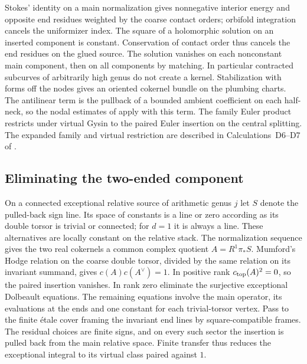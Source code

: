 Stokes' identity on a main normalization gives nonnegative interior
energy and opposite end residues weighted by the coarse contact
orders; orbifold integration cancels the uniformizer index. The
square of a holomorphic solution on an inserted component is
constant. Conservation of contact order thus cancels the end
residues on the glued source. The solution vanishes on each
nonconstant main component, then on all components by matching.
In particular contracted subcurves of arbitrarily high genus do not
create a kernel. Stabilization with forms off the nodes gives an
oriented cokernel bundle on the plumbing charts. The antilinear term
is the pullback of a bounded ambient coefficient on each half-neck,
so the nodal estimates of \cite[Appendix~B]{bai} apply with this term.
The family Euler product restricts under virtual Gysin to the paired
Euler insertion on the central splitting. The expanded family and
virtual restriction are described in
Calculations~D6--D7 of \cite{WueSupplement}.

\subsection{Eliminating the two-ended component}
On a connected exceptional relative source of arithmetic genus \(j\)
let \(S\) denote the pulled-back sign line. Its space of constants
is a line or zero according as its double torsor is trivial or
connected; for \(d=1\) it is always a line. These alternatives are
locally constant on the relative stack. The normalization sequence
gives the two real cokernels a common complex quotient
\(A=R^1\pi_*S\). Mumford's Hodge relation on the coarse double torsor,
divided by the same relation on its invariant summand, gives
\(c(A)c(A^\vee)=1\). In positive rank \(c_{\rm top}(A)^2=0\), so the
paired insertion vanishes. In rank zero eliminate the surjective
exceptional Dolbeault equations. The remaining equations involve the
main operator, its evaluations at the ends and one constant for each
trivial-torsor vertex. Pass to the finite étale cover framing the
invariant end lines by square-compatible frames. The residual choices
are finite signs, and on every such sector the insertion is pulled
back from the main relative space. Finite transfer thus reduces the
exceptional integral to its virtual class paired against \(1\).

